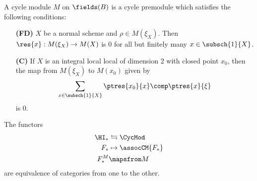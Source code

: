 \begin{defn}
A cycle module $M$ on $\fields(B)$ is a cycle premodule which
satisfies the following conditions:

\begin{enumerate}
\item[\textbf{(FD)}]  
$X$ be a normal scheme and $\rho \in M(\xi_X)$. Then $\res{x}: 
M(\xi_X) \to M(X)$ is 0 for all but finitely many $x \in 
\subsch{1}{X}$.

\item[\textbf{(C)}]  If $X$ is an integral
local local of dimension 2 with closed point $x_0$, then the map 
from $M(\xi_X)$ to $M(x_0)$ given by
\[
\sum_{x \in \subsch{1}{X}} \ptres{x_0}{x} \comp \ptres{x}{\xi}
\]
is 0.
\end{enumerate}
\end{defn}


\begin{thm}\label{thm_cycmod_eq_hm}
The functors
\begin{align*}
\HI_* &\leftrightarrows \CycMod \\
  F_* & \mapsto \assocCM{F_*}   \\
F^M_* & \mapsfrom M
\end{align*}
are equivalence of categories from one to the other.
\end{thm}
